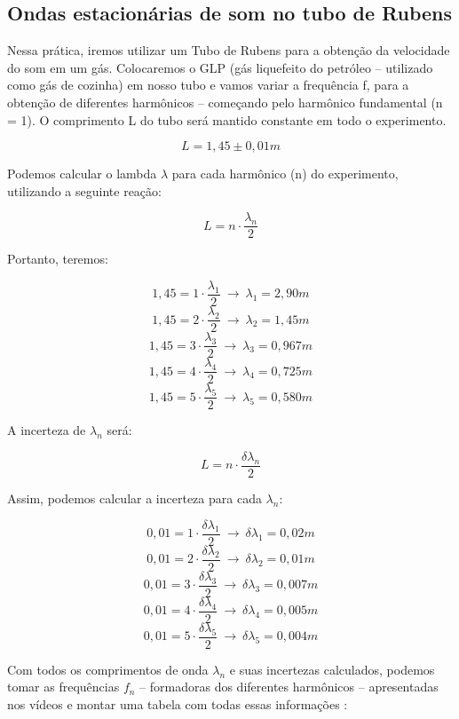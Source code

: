 \subsection{Ondas estacionárias de som no tubo de Rubens}

Nessa prática, iremos utilizar um Tubo de Rubens para a obtenção da velocidade do som em um gás. Colocaremos o GLP (gás liquefeito do petróleo – utilizado como gás de cozinha) em nosso tubo e vamos variar a frequência f, para a obtenção de diferentes harmônicos – começando pelo harmônico fundamental (n = 1). O comprimento L do tubo será mantido constante em todo o experimento. 

\[L = 1,45 \pm 0,01 m\]

Podemos calcular o lambda  $\lambda$ para cada harmônico (n) do experimento, utilizando a seguinte reação:

\[ L = n \cdot \frac{\lambda _n}{2}\]

Portanto, teremos:

\[ 1,45 = 1 \cdot \frac{\lambda _1}{2} \ \to \ \lambda _1 = 2,90 m  \]
\[ 1,45 = 2 \cdot \frac{\lambda _2}{2} \ \to \ \lambda _2 = 1,45 m  \]
\[ 1,45 = 3 \cdot \frac{\lambda _3}{2} \ \to \ \lambda _3 = 0,967 m  \]
\[ 1,45 = 4 \cdot \frac{\lambda _4}{2} \ \to \ \lambda _4 = 0,725 m  \]
\[ 1,45 = 5 \cdot \frac{\lambda _5}{2} \ \to \ \lambda _5 = 0,580 m  \]

A incerteza de $\lambda _n$ será:

\[ L = n \cdot \frac{\delta \lambda _n}{2}\]

Assim, podemos calcular a incerteza para cada $\lambda _n$:

\[ 0,01 = 1 \cdot \frac{\delta \lambda _1}{2} \ \to \  \delta \lambda _1 = 0,02 m  \]
\[ 0,01 = 2 \cdot \frac{\delta \lambda _2}{2} \ \to \  \delta \lambda _2 = 0,01 m  \]
\[ 0,01 = 3 \cdot \frac{\delta \lambda _3}{2} \ \to \  \delta \lambda _3 = 0,007 m  \]
\[ 0,01 = 4 \cdot \frac{\delta \lambda _4}{2} \ \to \  \delta \lambda _4 = 0,005 m  \]
\[ 0,01 = 5 \cdot \frac{\delta \lambda _5}{2} \ \to \  \delta \lambda _5 = 0,004 m  \]

Com todos os comprimentos de onda $\lambda _n$ e suas incertezas calculados, podemos tomar as frequências $f_n$ -- formadoras dos diferentes harmônicos -- apresentadas nos vídeos e montar uma tabela com todas essas informações  :\\


